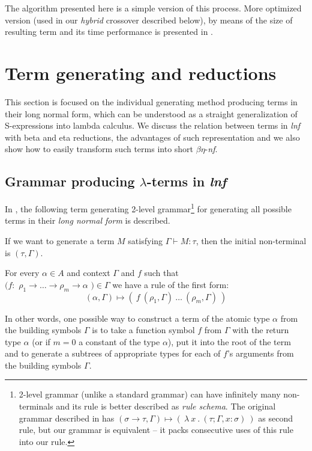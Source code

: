 \documentclass{sig-alternate}
\newcommand{\lterms}{$\lambda$-terms\xspace}
\newcommand{\tur}[3]{#1\vdash{}#2 \colon #3}
\newcommand{\benf}{$\beta\eta$-\textit{nf}\xspace}
\newcommand{\lnf}{\textit{lnf}\xspace}
\newcommand{\ar}{\rightarrow\xspace}
\newcommand{\gar}{\longmapsto}
\begin{document}
The algorithm presented here is a simple version of this process. 
More optimized version (used in our \textit{hybrid} crossover described below), by means of the size of resulting term and its time performance is presented in \cite{jones87}. 

\section{Term generating and reductions}
\label{generating}

This section is focused on the individual generating method producing
terms in their long normal form, which can be understood as a straight 
generalization of S-expressions into lambda calculus. 
We discuss the relation between terms in \lnf with beta and eta reductions,
the advantages of such representation and we also show how to easily 
transform such terms into short \benf.
   
\subsection{Grammar producing \lterms in \lnf}

In \cite{barendregt10}, the following term generating 2-level grammar\footnote{2-level grammar (unlike a standard grammar) can have infinitely many non-terminals and its rule is better described as \textit{rule schema}. The original grammar described in \cite{barendregt10} has $( \sigma \rightarrow \tau , \Gamma ) \gar (~\lambda~x~.~( \tau ; \Gamma,x:\sigma )~)$ as second rule, but our grammar is equivalent -- it packs consecutive uses of this rule into our rule.} for generating all possible
terms in their \textit{long normal form} is described.

If we want to generate a term $M$ satisfying $\tur{\Gamma}{M}{\tau}$,
then the initial non-terminal is $(\tau, \Gamma)$.

For every $\alpha \in A$ and context $\Gamma$ and $f$ such that \\
$(f :$ $\rho_1 \ar \dots \ar \rho_m \ar \alpha$ $) \in \Gamma$ 
we have a rule of the first form:
$$
( \alpha , \Gamma ) \gar 
(~f~( \rho_1 , \Gamma )~\dots~( \rho_m , \Gamma )~)
$$

In other words, one possible way to construct a term of 
the atomic type $\alpha$ from the building symbols $\Gamma$
is to take a function symbol $f$ from $\Gamma$ with 
the return type $\alpha$ (or if $m=0$ a constant of the type $\alpha$),
put it into the root of the term and to generate 
a subtrees of appropriate types for each of $f$'s arguments
from the building symbols $\Gamma$.  
\end{document}
